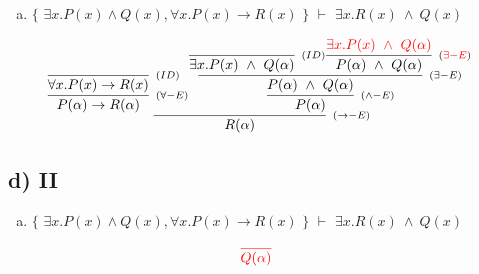 \documentclass[aspectratio=43]{beamer}
\begin{document}
    \begin{frame}[fragile]
    
    	\begin{enumerate}[d)]
			\item $\{$ $\exists x.P(x)\land Q(x), \forall x.P(x)\to R(x)$ $\}$ $\vdash$ $\exists x.R(x)\ \land\ Q(x) $\\
		\end{enumerate}
        
        \vspace{65pt}
        
        \[
        \begin{array}{c}
		
        	\infer[_{(\to -E)}]
            	{R(\alpha)}
            	{\infer[_{(\forall -E)}]
                	{P(\alpha) \rightarrow R(\alpha)} 
                    {\infer[_{(ID)}]
                    	{\forall x.P(x)\to R(x)}
                    	{}
                    }  
            	\infer[_{(\land -E)}] 
                	{P(\alpha)}
                    {\infer[_{(\exists -E)}]
                    	{P(\alpha)\ \land \ Q(\alpha)}
                    	{\infer[_{(ID)}]
                        	{\exists x.P(x)\ \land \ Q(\alpha)}
                            {}
                        \infer[_{(\textcolor{red}{\exists -E})}] 
                        	{P(\alpha)\ \land \ Q(\alpha)}
                            {\textcolor{red}{\exists x.P(x)\ \land \ Q(\alpha)}}
                        }
                    }
                }
		\end{array}
        \]
        
	\end{frame}
    
  
    \subsection{d) II}
    
    \begin{frame}[fragile]
    
    	\begin{enumerate}[d)]
			\item $\{$ $\exists x.P(x)\land Q(x), \forall x.P(x)\to R(x)$ $\}$ $\vdash$ $\exists x.R(x)\ \land\ Q(x) $\\
		\end{enumerate}
        
        \vspace{75pt}
        
        \[
        \begin{array}{c}
		
        	\textcolor{red}{
            \infer[_{}]
            	{Q(\alpha)}
            	{}
        	}
		\end{array}
        \]
        
	\end{frame}
    
\end{document}
